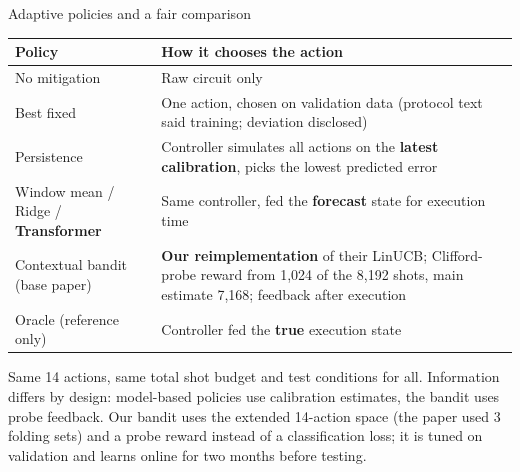 \documentclass[aspectratio=169,11pt]{beamer}
\begin{document}
\begin{frame}{Adaptive policies and a fair comparison}
\begin{table}\small
\begin{tabular}{>{\raggedright\arraybackslash}p{3.4cm}>{\raggedright\arraybackslash}p{9.2cm}}
\toprule
\textbf{Policy} & \textbf{How it chooses the action} \\
\midrule
No mitigation & Raw circuit only \\
Best fixed & One action, chosen on validation data (protocol text said training; deviation disclosed) \\
Persistence & Controller simulates all actions on the \textbf{latest calibration}, picks the lowest predicted error \\
Window mean / Ridge / \textbf{Transformer} & Same controller, fed the \textbf{forecast} state for execution time \\
Contextual bandit (base paper) & \textbf{Our reimplementation} of their LinUCB; Clifford-probe reward from 1,024 of the 8,192 shots, main estimate 7,168; feedback after execution \\
Oracle (reference only) & Controller fed the \textbf{true} execution state \\
\bottomrule
\end{tabular}
\end{table}
\small Same 14 actions, same total shot budget and test conditions for all. Information differs by design: model-based policies use calibration estimates, the bandit uses probe feedback. Our bandit uses the extended 14-action space (the paper used 3 folding sets) and a probe reward instead of a classification loss; it is tuned on validation and learns online for two months before testing.
\end{frame}
\end{document}

